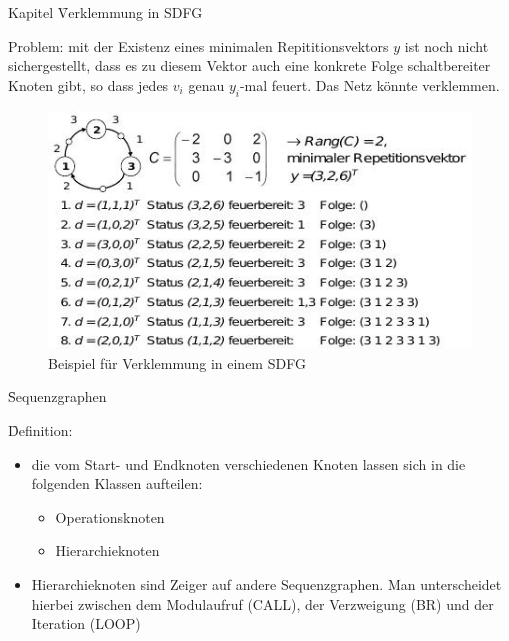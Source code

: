 \begin{chapter}{Kapitel}
\newpage
\f{Verklemmung in SDFG}

\noindent Problem: mit der Existenz eines minimalen Repititionsvektors $y$ ist noch nicht sichergestellt, dass es zu diesem Vektor auch eine konkrete Folge 
schaltbereiter Knoten gibt, so dass jedes $v_i$ genau $y_i$-mal feuert. Das Netz könnte verklemmen. 
\begin{figure}[!ht]
 \centering
 \includegraphics[scale=0.8]{pics/minRepVecVerkl}
 \caption{Beispiel für Verklemmung in einem SDFG}
\end{figure}

\f{Sequenzgraphen}

\noindent \f{Definition}: 
\begin{itemize}
 \item die vom Start- und Endknoten verschiedenen Knoten lassen sich in die folgenden Klassen aufteilen:
 \begin{itemize}
  \item Operationsknoten 
  \item Hierarchieknoten
 \end{itemize}
 \item Hierarchieknoten sind Zeiger auf andere Sequenzgraphen. Man unterscheidet hierbei zwischen dem Modulaufruf (CALL), der Verzweigung (BR) und der Iteration 
 (LOOP) 
\end{itemize}


\end{chapter}
